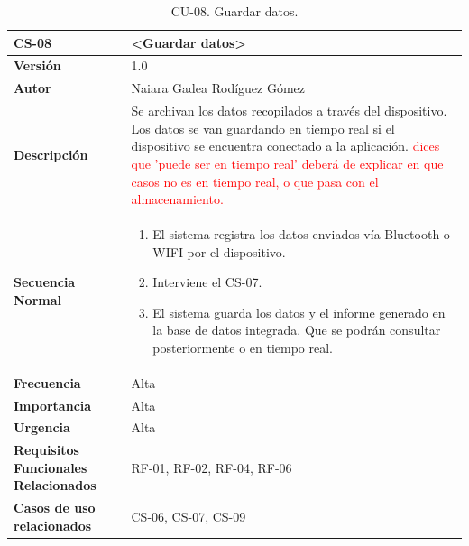 \begin{table}[h!]
\centering
\begin{tabular}{ |m{3cm}|m{11cm}|  } 
\hline
\cellcolor[HTML]{B9E3F0}\textbf{CS-08} & \cellcolor[HTML]{B9E3F0}\textbf{<Guardar datos>}\\

\hline
\cellcolor[HTML]{EFEFEF}\textbf{Versión}             & 1.0  \\
\hline
\cellcolor[HTML]{EFEFEF}\textbf{Autor}                & Naiara Gadea Rodíguez Gómez\\
\hline
\cellcolor[HTML]{EFEFEF}\textbf{Descripción}                & {Se archivan los datos recopilados a través del dispositivo. Los datos se van guardando en tiempo real si el dispositivo se encuentra conectado a la aplicación.\textcolor{red}{ dices que 'puede ser en tiempo real' deberá de explicar en que casos no es en tiempo real, o que pasa con el almacenamiento.}}\\
\hline
\cellcolor[HTML]{EFEFEF}\textbf{Secuencia \newline Normal}                &                 
        \begin{enumerate}
			\def\labelenumi{\arabic{enumi}.}
			\tightlist
			\item El sistema registra los datos enviados vía Bluetooth o WIFI por el dispositivo.
			\item Interviene el CS-07.
                \item El sistema guarda los datos y el informe generado en la base de datos integrada. Que se podrán consultar posteriormente o en tiempo real.
		\end{enumerate}\\
\hline
\cellcolor[HTML]{EFEFEF}\textbf{Frecuencia}                & Alta\\
\hline
\cellcolor[HTML]{EFEFEF}\textbf{Importancia}                & Alta\\
\hline
\cellcolor[HTML]{EFEFEF}\textbf{Urgencia}                & Alta\\
\hline
\cellcolor[HTML]{EFEFEF}\textbf{Requisitos Funcionales Relacionados}                & {RF-01, RF-02, RF-04, RF-06} \\
\hline
\cellcolor[HTML]{EFEFEF}\textbf{Casos de uso relacionados}                & {CS-06, CS-07, CS-09}\\
\hline
\end{tabular}
\caption{CU-08. Guardar datos.}
\end{table}


